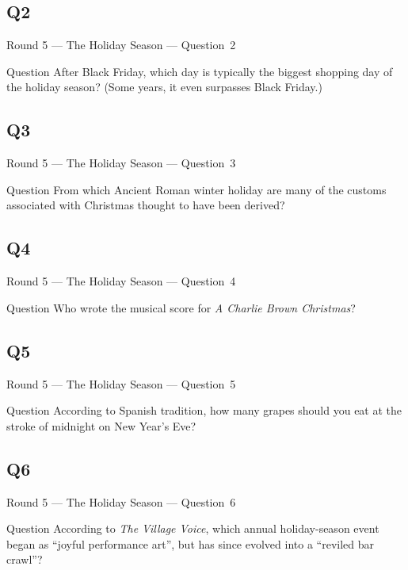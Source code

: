 \documentclass[11pt]{beamer}
\begin{document}
\subsection*{Q2}
\begin{frame}[t]{Round 5 --- The Holiday Season --- \mbox{Question 2}}
\vspace{-0.5em}
\begin{block}{Question}
After Black Friday, which day is typically the biggest shopping day of the holiday season? (Some years, it even surpasses Black Friday.)
\end{block}
\end{frame}
\subsection*{Q3}
\begin{frame}[t]{Round 5 --- The Holiday Season --- \mbox{Question 3}}
\vspace{-0.5em}
\begin{block}{Question}
From which Ancient Roman winter holiday are many of the customs associated with Christmas thought to have been derived?
\end{block}
\end{frame}
\subsection*{Q4}
\begin{frame}[t]{Round 5 --- The Holiday Season --- \mbox{Question 4}}
\vspace{-0.5em}
\begin{block}{Question}
Who wrote the musical score for \emph{A Charlie Brown Christmas}?
\end{block}
\end{frame}
\subsection*{Q5}
\begin{frame}[t]{Round 5 --- The Holiday Season --- \mbox{Question 5}}
\vspace{-0.5em}
\begin{block}{Question}
According to Spanish tradition, how many grapes should you eat at the stroke of midnight on New Year's Eve?
\end{block}
\end{frame}
\subsection*{Q6}
\begin{frame}[t]{Round 5 --- The Holiday Season --- \mbox{Question 6}}
\vspace{-0.5em}
\begin{block}{Question}
According to \emph{The Village Voice}, which annual holiday-season event began as ``joyful performance art'', but has since evolved into a ``reviled bar crawl''?
\end{block}
\end{frame}
\end{document}
